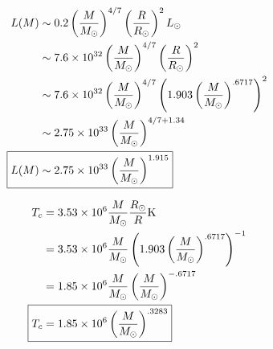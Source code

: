 \documentclass[10pt,letter,preprint]{aastex}
\newcommand{\lp}{\left(}
\newcommand{\rp}{\right)}
\begin{document}
\begin{align}
L(M) & \sim 0.2 \lp \frac{M}{M_\odot} \rp^{4/7} \lp \frac{R}{R_\odot} \rp^2 L_\odot\\
& \sim 7.6 \times 10^{32} \lp \frac{M}{M_\odot} \rp^{4/7} \lp \frac{R}{R_\odot} \rp^2\\
& \sim 7.6 \times 10^{32} \lp \frac{M}{M_\odot} \rp^{4/7} \lp 1.903 \left( \frac{M}{M_\odot} \right)^{.6717} \rp^2\\
& \sim 2.75 \times 10^{33} \lp \frac{M}{M_\odot} \rp^{4/7 + 1.34}\\
\Aboxed{L(M) & \sim 2.75 \times 10^{33} \lp \frac{M}{M_\odot} \rp^{1.915}}
\end{align}

\begin{align}
T_c & = 3.53 \times 10^{6} \frac{M}{M_\odot} \frac{R_\odot}{R} \text{K}\\
& = 3.53 \times 10^{6} \frac{M}{M_\odot} \lp 1.903 \lp \frac{M}{M_\odot} \right)^{.6717} \rp^{-1}\\
& = 1.85 \times 10^6 \frac{M}{M_\odot} \lp \frac{M}{M_\odot} \rp^{-.6717}\\
\Aboxed{T_c & = 1.85 \times 10^6 \lp \frac{M}{M_\odot} \rp^{.3283}}
\end{align}
\end{document}
